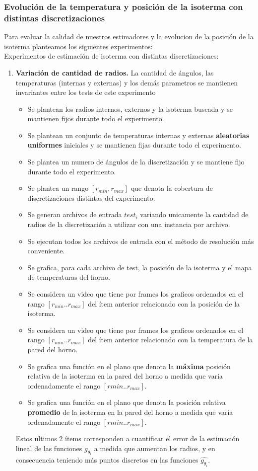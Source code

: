 \subsubsection{Evolución de la temperatura y posición de la isoterma con distintas discretizaciones}
Para evaluar la calidad de nuestros estimadores y la evolucion de la posición de la isoterma planteamos los siguientes experimentos:\\
Experimentos de estimación de isoterma con distintas discretizaciones:
\begin{enumerate}
    \item \textbf{Variación de cantidad de radios.} La cantidad de ángulos, las temperaturas (internas y externas) y los demás parametros se mantienen invariantes entre los tests de este experimento
    \begin{itemize}
        \item Se plantean los radios internos, externos y la isoterma buscada y se mantienen fijos durante todo el experimento.
        \item Se plantean un conjunto de temperaturas internas y externas \textbf{aleatorias uniformes} iniciales y se mantienen fijas durante todo el experimento.
        \item Se plantea un numero de ángulos de la discretización y se mantiene fijo durante todo el experimento. 
        \item Se plantea un rango $[r_{min}, r_{max}]$ que denota la cobertura de discretizaciones distintas del experimento.
        \item Se generan archivos de entrada $test_i$ variando unicamente la cantidad de radios de la discretización a utilizar con una instancia por archivo.
        \item Se ejecutan todos los archivos de entrada con el método de resolución más conveniente.
        \item Se grafica, para cada archivo de test, la posición de la isoterma y el mapa de temperaturas del horno.
        \item Se considera un video que tiene por frames los graficos ordenados en el rango $[r_{min}..r_{max}]$ del ítem anterior relacionado con la posición de la isoterma.
        \item Se considera un video que tiene por frames los graficos ordenados en el rango $[r_{min}..r_{max}]$ del ítem anterior relacionado con la temperatura de la pared del horno.
        \item Se grafica una función en el plano que denota la \textbf{máxima} posición relativa de la isoterma en la pared del horno a medida que varía ordenadamente el rango $[r{min}..r_{max}]$.
        \item Se grafica una función en el plano que denota la posición relativa \textbf{promedio} de la isoterma en la pared del horno a medida que varía ordenadamente el rango $[r{min}..r_{max}]$.
    \end{itemize}  Estos ultimos 2 ítems corresponden a cuantificar el error de la estimación lineal de las funciones $g_{\theta_i}$ a medida que aumentan los radios, y en consecuencia teniendo más puntos discretos en las funciones $\hat{g_{\theta_i}}$.


\end{enumerate}

